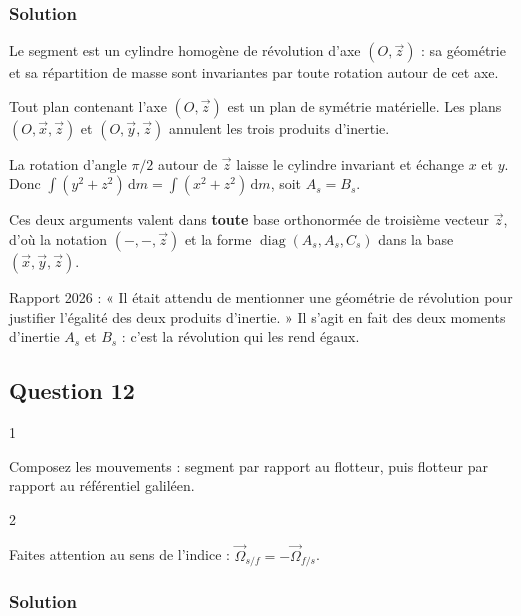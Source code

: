 \documentclass[11pt,a4paper]{article}
\begin{document}
\hypertarget{solution-10}{%
\subsubsection{Solution}\label{solution-10}}

Le segment est un cylindre homogène de révolution d'axe \((O,\vec z)\) : sa géométrie et sa répartition de masse sont invariantes par toute rotation autour de cet axe.

Tout plan contenant l'axe \((O,\vec z)\) est un plan de symétrie matérielle. Les plans \((O,\vec x,\vec z)\) et \((O,\vec y,\vec z)\) annulent les trois produits d'inertie.

La rotation d'angle \(\pi/2\) autour de \(\vec z\) laisse le cylindre invariant et échange \(x\) et \(y\). Donc \(\int(y^2+z^2)\,\mathrm dm=\int(x^2+z^2)\,\mathrm dm\), soit \(A_s=B_s\).

Ces deux arguments valent dans \textbf{toute} base orthonormée de troisième vecteur \(\vec z\), d'où la notation \((-,-,\vec z)\) et la forme \(\operatorname{diag}(A_s,A_s,C_s)\) dans la base \((\vec x,\vec y,\vec z)\).

\begin{jury}

Rapport 2026 : « Il était attendu de mentionner une géométrie de révolution pour justifier l'égalité des deux produits d'inertie. » Il s'agit en fait des deux moments d'inertie \(A_s\) et \(B_s\) : c'est la révolution qui les rend égaux.

\end{jury}

\hypertarget{question-12}{%
\subsection{Question 12}\label{question-12}}

\begin{indication}{1}

Composez les mouvements : segment par rapport au flotteur, puis flotteur par rapport au référentiel galiléen.

\end{indication}

\begin{indication}{2}

Faites attention au sens de l'indice : \(\vec\Omega_{s/f}=-\vec\Omega_{f/s}\).

\end{indication}

\hypertarget{solution-11}{%
\subsubsection{Solution}\label{solution-11}}
\end{document}
